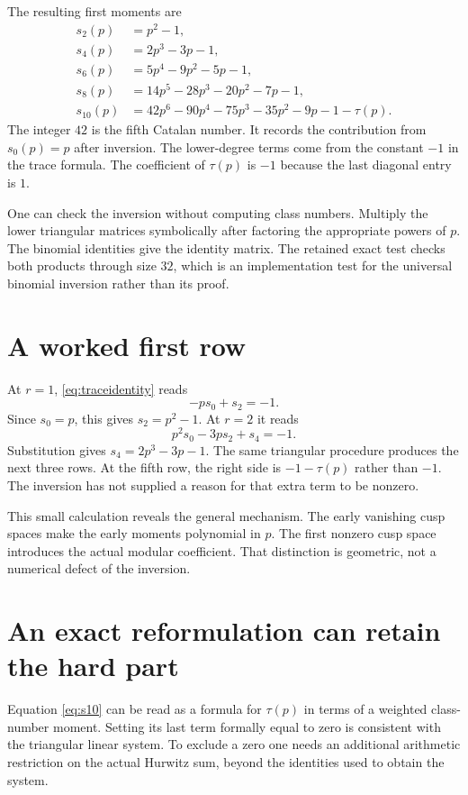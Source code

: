 The resulting first moments are
\begin{align}
s_2(p)&=p^2-1,\\
s_4(p)&=2p^3-3p-1,\\
s_6(p)&=5p^4-9p^2-5p-1,\\
s_8(p)&=14p^5-28p^3-20p^2-7p-1,\\
s_{10}(p)&=42p^6-90p^4-75p^3-35p^2-9p-1-\tau(p).
\label{eq:s10}
\end{align}
The integer $42$ is the fifth Catalan number. It records the contribution from $s_0(p)=p$ after inversion. The lower-degree terms come from the constant $-1$ in the trace formula. The coefficient of $\tau(p)$ is $-1$ because the last diagonal entry is $1$.

One can check the inversion without computing class numbers. Multiply the lower triangular matrices symbolically after factoring the appropriate powers of $p$. The binomial identities give the identity matrix. The retained exact test checks both products through size $32$, which is an implementation test for the universal binomial inversion rather than its proof.

\section{A worked first row}
At $r=1$, \eqref{eq:traceidentity} reads
\[
-ps_0+s_2=-1.
\]
Since $s_0=p$, this gives $s_2=p^2-1$. At $r=2$ it reads
\[
p^2s_0-3ps_2+s_4=-1.
\]
Substitution gives $s_4=2p^3-3p-1$. The same triangular procedure produces the next three rows. At the fifth row, the right side is $-1-\tau(p)$ rather than $-1$. The inversion has not supplied a reason for that extra term to be nonzero.

This small calculation reveals the general mechanism. The early vanishing cusp spaces make the early moments polynomial in $p$. The first nonzero cusp space introduces the actual modular coefficient. That distinction is geometric, not a numerical defect of the inversion.

\section{An exact reformulation can retain the hard part}
Equation \eqref{eq:s10} can be read as a formula for $\tau(p)$ in terms of a weighted class-number moment. Setting its last term formally equal to zero is consistent with the triangular linear system. To exclude a zero one needs an additional arithmetic restriction on the actual Hurwitz sum, beyond the identities used to obtain the system.


